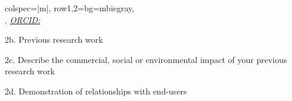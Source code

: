 \documentclass[a4paper,12pt]{article}
\begin{document}
    \begin{table}[H]
        \begin{tblr}{
            colspec={|m{\textwidth}|},
            row{1,2}={bg=mbiegray},
        }
            \hline
                                     \\
            \hline
            , \href{https://orcid.org/\orcididnum}{\textit{ORCID:\orcididnum}} \\
            \hline
        \end{tblr}
    \end{table}

    \printbibliography[heading=none, filter=peerreview]

    \printbibliography[heading=none, filter=confrencepro]

    \printbibliography[heading=none, filter=reports]



    \begin{breakawaybox}{2b. Previous research work}
        
    \end{breakawaybox}

    \begin{breakawaybox}{{2c. Describe the commercial, social or environmental impact of your previous research work}}
        
    \end{breakawaybox}

    \begin{breakawaybox}{2d. Demonstration of relationships with end-users}
        
    \end{breakawaybox}
\end{document}
